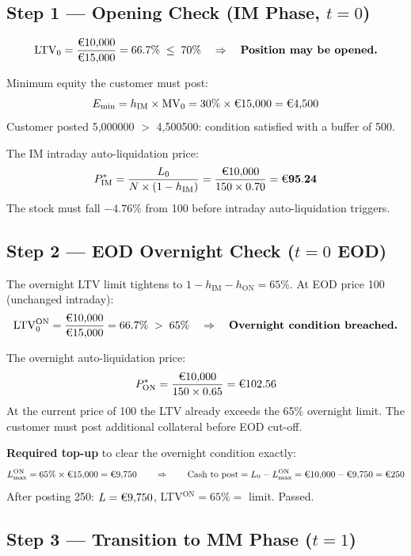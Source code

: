\documentclass[9pt, a4paper]{extarticle}
\newcommand{\EUR}[1]{\ifmmode\text{\texteuro}#1\else\texteuro#1\fi}
\begin{document}
\subsection{Step 1 — Opening Check (IM Phase, $t = 0$)}

\[
    \mathrm{LTV}_0 = \frac{\EUR{10{,}000}}{\EUR{15{,}000}} = 66.7\%
    \;\leq\; 70\%
    \quad\Rightarrow\quad \textbf{Position may be opened.}
\]

Minimum equity the customer must post:
\[
    E_{\min} = h_{\mathrm{IM}} \times \mathrm{MV}_0 = 30\% \times \EUR{15{,}000} = \EUR{4{,}500}
\]
Customer posted \EUR{5{,}000} $>$ \EUR{4{,}500}: condition satisfied with a buffer of \EUR{500}.

The IM intraday auto-liquidation price:
\[
    P^{*}_{\mathrm{IM}} = \frac{L_0}{N \times (1 - h_{\mathrm{IM}})}
    = \frac{\EUR{10{,}000}}{150 \times 0.70}
    = \mathbf{\EUR{95.24}}
\]
The stock must fall $-4.76\%$ from \EUR{100} before intraday auto-liquidation triggers.

\subsection{Step 2 — EOD Overnight Check ($t = 0$ EOD)}

The overnight LTV limit tightens to $1 - h_{\mathrm{IM}} - h_{\mathrm{ON}} = 65\%$.
At EOD price \EUR{100} (unchanged intraday):
\[
    \mathrm{LTV}^{\mathrm{ON}}_0 = \frac{\EUR{10{,}000}}{\EUR{15{,}000}} = 66.7\%
    \;>\; 65\%
    \quad\Rightarrow\quad \textbf{Overnight condition breached.}
\]

The overnight auto-liquidation price:
\[
    P^{*}_{\mathrm{ON}} = \frac{\EUR{10{,}000}}{150 \times 0.65} = \EUR{102.56}
\]
At the current price of \EUR{100} the LTV already exceeds the 65\% overnight limit.
The customer must post additional collateral before EOD cut-off.

\textbf{Required top-up} to clear the overnight condition exactly:
\[
    L_{\max}^{\mathrm{ON}} = 65\% \times \EUR{15{,}000} = \EUR{9{,}750}
    \qquad\Rightarrow\qquad
    \text{Cash to post} = L_0 - L_{\max}^{\mathrm{ON}} = \EUR{10{,}000} - \EUR{9{,}750} = \EUR{250}
\]
After posting \EUR{250}: $L = \EUR{9{,}750}$, LTV$^{\mathrm{ON}} = 65\% = $ limit. Passed.

\subsection{Step 3 — Transition to MM Phase ($t = 1$)}
\end{document}
